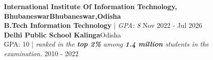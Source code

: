 \textbf{International Institute Of Information Technology, Bhubaneswar}\hfill \textbf{Bhubaneswar,Odisha}\\
\textbf{B.Tech Information Technology} | \textit{GPA: 8} \hfill Nov 2022 - Jul 2026\\
\vspace{2mm}
\textbf{Delhi Public School Kalinga}\hfill Odisha\\
GPA: 10 | \textit{ranked in the \textbf{top 2\%} among \textbf{1.4 million} students in the examination.} \hfill 2010 - 2022\\
\vspace{2mm}

